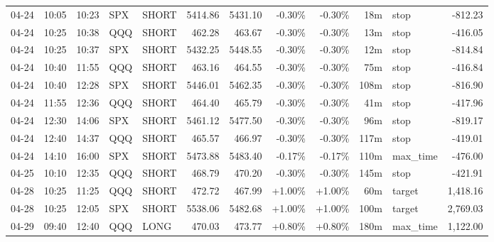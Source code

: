 \documentclass[11pt,a4paper,twoside]{article}
\begin{document}
\begin{center}
\begin{longtable}{>{\color{txtmain}}l l l l l r r r r r >{\color{txtmain}}l r}
04-24 & 10:05 & 10:23 & SPX & SHORT & 5414.86 & 5431.10 & \textcolor{lossred}{-0.30\%} & \textcolor{lossred}{-0.30\%} & 18m & stop & \textcolor{lossred}{-812.23} \\
04-24 & 10:25 & 10:38 & QQQ & SHORT & 462.28 & 463.67 & \textcolor{lossred}{-0.30\%} & \textcolor{lossred}{-0.30\%} & 13m & stop & \textcolor{lossred}{-416.05} \\
04-24 & 10:25 & 10:37 & SPX & SHORT & 5432.25 & 5448.55 & \textcolor{lossred}{-0.30\%} & \textcolor{lossred}{-0.30\%} & 12m & stop & \textcolor{lossred}{-814.84} \\
04-24 & 10:40 & 11:55 & QQQ & SHORT & 463.16 & 464.55 & \textcolor{lossred}{-0.30\%} & \textcolor{lossred}{-0.30\%} & 75m & stop & \textcolor{lossred}{-416.84} \\
04-24 & 10:40 & 12:28 & SPX & SHORT & 5446.01 & 5462.35 & \textcolor{lossred}{-0.30\%} & \textcolor{lossred}{-0.30\%} & 108m & stop & \textcolor{lossred}{-816.90} \\
04-24 & 11:55 & 12:36 & QQQ & SHORT & 464.40 & 465.79 & \textcolor{lossred}{-0.30\%} & \textcolor{lossred}{-0.30\%} & 41m & stop & \textcolor{lossred}{-417.96} \\
04-24 & 12:30 & 14:06 & SPX & SHORT & 5461.12 & 5477.50 & \textcolor{lossred}{-0.30\%} & \textcolor{lossred}{-0.30\%} & 96m & stop & \textcolor{lossred}{-819.17} \\
04-24 & 12:40 & 14:37 & QQQ & SHORT & 465.57 & 466.97 & \textcolor{lossred}{-0.30\%} & \textcolor{lossred}{-0.30\%} & 117m & stop & \textcolor{lossred}{-419.01} \\
04-24 & 14:10 & 16:00 & SPX & SHORT & 5473.88 & 5483.40 & \textcolor{lossred}{-0.17\%} & \textcolor{lossred}{-0.17\%} & 110m & max\_time & \textcolor{lossred}{-476.00} \\
04-25 & 10:10 & 12:35 & QQQ & SHORT & 468.79 & 470.20 & \textcolor{lossred}{-0.30\%} & \textcolor{lossred}{-0.30\%} & 145m & stop & \textcolor{lossred}{-421.91} \\
04-28 & 10:25 & 11:25 & QQQ & SHORT & 472.72 & 467.99 & \textcolor{wingreen}{+1.00\%} & \textcolor{wingreen}{+1.00\%} & 60m & target & \textcolor{wingreen}{1,418.16} \\
04-28 & 10:25 & 12:05 & SPX & SHORT & 5538.06 & 5482.68 & \textcolor{wingreen}{+1.00\%} & \textcolor{wingreen}{+1.00\%} & 100m & target & \textcolor{wingreen}{2,769.03} \\
04-29 & 09:40 & 12:40 & QQQ & LONG & 470.03 & 473.77 & \textcolor{wingreen}{+0.80\%} & \textcolor{wingreen}{+0.80\%} & 180m & max\_time & \textcolor{wingreen}{1,122.00} \\

\end{longtable}
\end{center}
\end{document}
